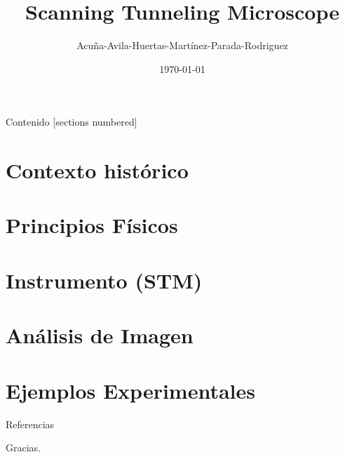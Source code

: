 \documentclass[aspectratio=169]{beamer}
\title{Scanning Tunneling Microscope}
\subtitle{}
\date{\today}
\author{Acuña-Avila-Huertas-Martínez-Parada-Rodriguez}
\begin{document}
\maketitle

\begin{frame}{Contenido}
  [sections numbered]
  \tableofcontents
\end{frame}

\section{Contexto histórico}


\section{Principios Físicos}


\section{Instrumento (STM)}


\section{Análisis de Imagen}


\section{Ejemplos Experimentales}


\begin{frame}[allowframebreaks]{Referencias}
  \printbibliography
  \nocite{*}
\end{frame}

\begin{frame}[plain]
  \centering
  \vspace{1cm}
  {\Huge Gracias.}\\[1cm]
\end{frame}
\end{document}
